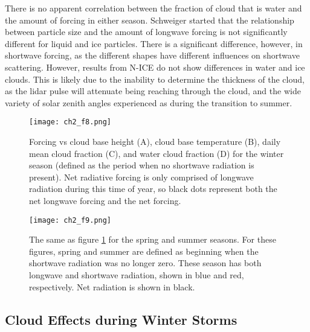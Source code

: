 There is no apparent correlation between the fraction of cloud that is water and the amount of forcing in either season. Schweiger \cite{schweiger:1999} started that the relationship between particle size and the amount of longwave forcing is not significantly different for liquid and ice particles. There is a significant difference, however, in shortwave forcing, as the different shapes have different influences on shortwave scattering. However, results from N-ICE do not show differences in water and ice clouds. This is likely due to the inability to determine the thickness of the cloud, as the lidar pulse will attenuate being reaching through the cloud, and the wide variety of solar zenith angles experienced as during the transition to summer. 

\begin{figure}[H]
    \centering
    \texttt{[image: ch2\_f8.png]}
    \caption[Cloud radiative forcing vs cloud base height, cloud base temperature, cloud fraction, and water cloud fraction]{Forcing vs cloud base height (A), cloud base temperature (B), daily mean cloud fraction (C), and water cloud fraction (D) for the winter season (defined as the period when no shortwave radiation is present). Net radiative forcing is only comprised of longwave radiation during this time of year, so black dots represent both the net longwave forcing and the net forcing.}
    \label{fig:ch2_f8}
\end{figure}

\begin{figure}[H]
    \centering
    \texttt{[image: ch2\_f9.png]}
    \caption[Spring and summer cloud radiative forcing vs cloud base height, cloud base temperature, cloud fraction, and water cloud fraction]{The same as figure \ref{fig:ch2_f8} for the spring and summer seasons. For these figures, spring and summer are defined as beginning when the shortwave radiation was no longer zero. These season has both longwave and shortwave radiation, shown in blue and red, respectively. Net radiation is shown in black.}
    \label{fig:ch2_f9}
\end{figure}

\subsection{Cloud Effects during Winter Storms}

